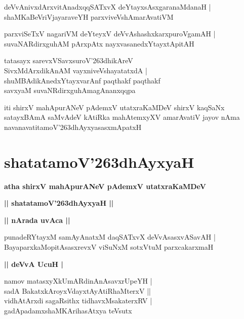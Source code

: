 \documentclass[twoside,12pt,openright]{book}
\def\S{\char'263}
\newcounter{shloka}[chapter]
\def\uvaca#1{\centerline{{\large\textbf{#1}}}}
\begin{document}
\begin{shloka}%
deVvAnivxdArxvitAnadxqqSATxvX deYtayxsAsxgaranaMdanaH |\\
shaMKaBeVriVjayaraveYH parxviveVshAmarAvatiVM 
\end{shloka}

\begin{shloka}%
parxviSeTxV nagariVM deYteyxV deVvAshashxkarxpuroVgamAH |\\
suvaNARdirxguhAM pArxpAtx nayxvasanedxYtayxtApitAH 
\end{shloka}

\begin{shloka}%
tatasayx sarevxVSavxsuroV\S dhikAreV \\
SivxMdArxdikAnAM vayxniveVshayatatxdA |\\
shuMBAdikAnedxYtayxvarAnf paqthakf paqthakf \\
savxyaM suvaNRdirxguhAmagAnanxqqpa
\end{shloka}

\begin{center}
iti shirxV mahApurANeV pAdemxV utatxraKaMDeV shirxV kaqSaNx satayxBAmA saMvAdeV kAtiRka 
mahAtemxyXV amarAvatiV jayov nAma navanavatitamoV\S dhAyxyasasxmApatxH 
\end{center}

\chapter{shatatamoV\S dhAyxyaH}

\begin{center}
{\LARGE\bfseries atha shirxV mahApurANeV pAdemxV utatxraKaMDeV}
\end{center}

\begin{center}
{\LARGE\bfseries || shatatamoV\S dhAyxyaH || }
\end{center}

\uvaca{|| nArada uvAca ||}

\begin{shloka}%
punadeRYtayxM samAyAnatxM daqSATxvX deVvAsasxvASavAH |\\
BayaparxkaMopitAsasxrevxV viSuNxM sotxVtuM parxcakarxmaH
\end{shloka}

\uvaca{|| deVvA UcuH |}

\begin{shloka}%
namov matasxyXkUmARdinAnAsavxrUpeYH |\\
sadA BakatxkAroyxVdayxtAyAtiRhaMterxV ||\\
vidhAtArxdi sagaRsithx tidhavxMsakaterxRV |\\
gadApadamxshaMKArihasAtxya teVsutx
\end{shloka}
\end{document}
